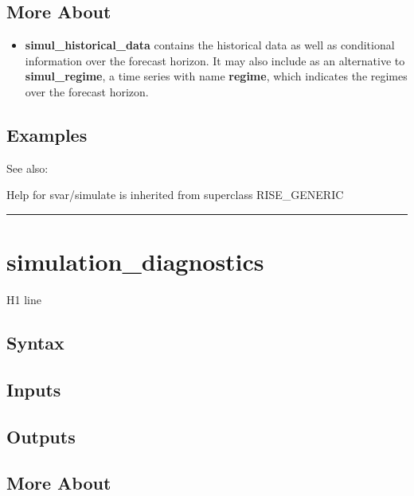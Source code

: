 \documentclass[letterpaper,10pt,english]{sphinxmanual}
\begin{document}
\subsection{More About}
\label{classes/models/@svar/svar:id136}\begin{itemize}
\item {} 
\textbf{simul\_historical\_data} contains the historical data as well as
conditional information over the forecast horizon. It may also include
as an alternative to \textbf{simul\_regime}, a time series with name
\textbf{regime}, which indicates the regimes over the forecast horizon.

\end{itemize}


\subsection{Examples}
\label{classes/models/@svar/svar:id137}
See also:

Help for svar/simulate is inherited from superclass RISE\_GENERIC


\bigskip\hrule{}\bigskip



\section{simulation\_diagnostics}
\label{classes/models/@svar/svar:id138}\label{classes/models/@svar/svar:simulation-diagnostics}
H1 line


\subsection{Syntax}
\label{classes/models/@svar/svar:id139}

\subsection{Inputs}
\label{classes/models/@svar/svar:id140}

\subsection{Outputs}
\label{classes/models/@svar/svar:id141}

\subsection{More About}
\label{classes/models/@svar/svar:id142}
\end{document}
